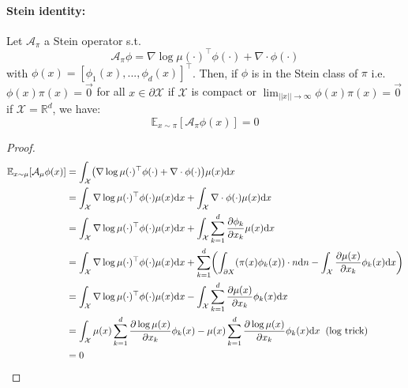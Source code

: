 \documentclass[runningheads,a4paper]{llncs}
\newcommand{\R}{\mathbb{R}}
\newcommand{\E}{\mathbb{E}}
\newcommand{\X}{\mathcal{X}}
\newcommand{\A}{\mathcal{A}}
\newcommand{\diff}[2]{\frac{\partial #1}{\partial #2}}
\newcommand{\dr}{\mathrm{d}}
\DeclarePairedDelimiter{\pare}{(}{)}
\begin{document}
\paragraph{\bf Stein identity:}
Let $\A_\pi$ a Stein operator s.t.
$$
\A_\pi \phi = \nabla \log \mu(\cdot)^\top \phi(\cdot) + \nabla \cdot \phi(\cdot)
$$
with $\phi(x) = [\phi_1(x), ..., \phi_d(x)]^\top$.
Then, if $\phi$ is in the Stein class of $\pi$ i.e. $\phi(x)\pi(x) = \vec{0}$ for all $x \in \partial \X$
if $\X$ is compact or $\lim_{||x|| \to \infty} \phi(x)\pi(x) = \vec{0}$ if $\X = \R^d$, we have:
\begin{equation}
  \E_{x \sim \pi}[\A_\pi \phi (x)] = 0
  \label{eq:stein_id}
\end{equation}
\begin{proof}
  \begin{align*}
    \E_{x \sim \mu}[\A_\mu \phi (x)] &=
      \int_\X \pare*{ \nabla \log \mu(\cdot)^\top \phi(\cdot) + \nabla \cdot \phi(\cdot) } \mu(x) \dr x \\
    &= \int_\X \nabla \log \mu(\cdot)^\top \phi(\cdot) \mu(x) \dr x + \int_\X \nabla \cdot \phi(\cdot) \mu(x) \dr x \\
    &= \int_\X \nabla \log \mu(\cdot)^\top \phi(\cdot) \mu(x) \dr x +
      \int_\X \sum_{k=1}^d \diff{\phi_k}{x_k} \mu(x) \dr x \\
    &= \int_\X \nabla \log \mu(\cdot)^\top \phi(\cdot) \mu(x) \dr x +
    \sum_{k=1}^d \pare*{\int_{\partial X}\pare*{\pi(x) \phi_k(x)} \cdot n \dr n - \int_\X \diff{\mu(x)}{x_k} \phi_k(x) \dr x} \\
    &= \int_\X \nabla \log \mu(\cdot)^\top \phi(\cdot) \mu(x) \dr x -
      \int_\X \sum_{k=1}^d \diff{\mu(x)}{x_k} \phi_k(x) \dr x \\
    &= \int_\X  \mu(x) \sum_{k=1}^d \diff{\log \mu(x)}{x_k}\phi_k(x) -
    \mu(x) \sum_{k=1}^d \diff{\log \mu(x)}{x_k} \phi_k(x) \dr x \;\; \text{(log trick)} \\
    &= 0
  \end{align*}
\end{proof}
\end{document}
